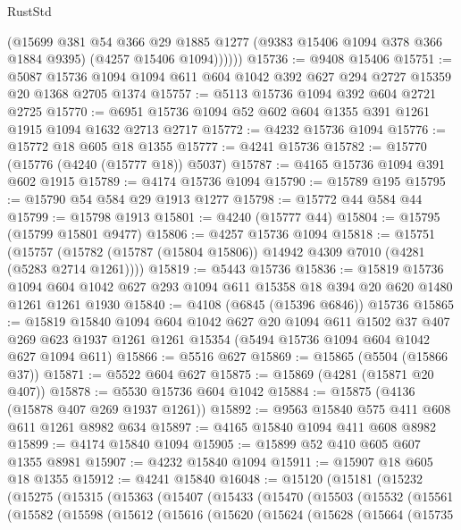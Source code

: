 \begin{lexlean}{RustStd}
\begin{coremodule}
            (@15699
              @381
              @54
              @366
              @29
              @1885
              @1277
              (@9383 @15406 @1094 @378 @366 @1884 @9395)
              (@4257 @15406 @1094))))))
@15736 := @9408 @15406
@15751 := @5087 @15736 @1094 @1094 @611 @604 @1042 @392 @627 @294 @2727 @15359 @20 @1368 @2705 @1374
@15757 := @5113 @15736 @1094 @392 @604 @2721 @2725
@15770 := @6951 @15736 @1094 @52 @602 @604 @1355 @391 @1261 @1915 @1094 @1632 @2713 @2717
@15772 := @4232 @15736 @1094
@15776 := @15772 @18 @605 @18 @1355
@15777 := @4241 @15736
@15782 := @15770 (@15776 (@4240 (@15777 @18)) @5037)
@15787 := @4165 @15736 @1094 @391 @602 @1915
@15789 := @4174 @15736 @1094
@15790 := @15789 @195
@15795 := @15790 @54 @584 @29 @1913 @1277
@15798 := @15772 @44 @584 @44
@15799 := @15798 @1913
@15801 := @4240 (@15777 @44)
@15804 := @15795 (@15799 @15801 @9477)
@15806 := @4257 @15736 @1094
@15818 := @15751
    (@15757 (@15782 (@15787 (@15804 @15806)) @14942 @4309 @7010 (@4281 (@5283 @2714 @1261))))
@15819 := @5443 @15736
@15836 := @15819
    @15736
    @1094
    @604
    @1042
    @627
    @293
    @1094
    @611
    @15358
    @18
    @394
    @20
    @620
    @1480
    @1261
    @1261
    @1930
@15840 := @4108 (@6845 (@15396 @6846)) @15736
@15865 := @15819
    @15840
    @1094
    @604
    @1042
    @627
    @20
    @1094
    @611
    @1502
    @37
    @407
    @269
    @623
    @1937
    @1261
    @1261
    @15354
    (@5494 @15736 @1094 @604 @1042 @627 @1094 @611)
@15866 := @5516 @627
@15869 := @15865 (@5504 (@15866 @37))
@15871 := @5522 @604 @627
@15875 := @15869 (@4281 (@15871 @20 @407))
@15878 := @5530 @15736 @604 @1042
@15884 := @15875 (@4136 (@15878 @407 @269 @1937 @1261))
@15892 := @9563 @15840 @575 @411 @608 @611 @1261 @8982 @634
@15897 := @4165 @15840 @1094 @411 @608 @8982
@15899 := @4174 @15840 @1094
@15905 := @15899 @52 @410 @605 @607 @1355 @8981
@15907 := @4232 @15840 @1094
@15911 := @15907 @18 @605 @18 @1355
@15912 := @4241 @15840
@16048 := @15120
    (@15181
      (@15232
        (@15275
          (@15315
            (@15363
              (@15407
                (@15433
                  (@15470
                    (@15503
                      (@15532
                        (@15561
                          (@15582
                            (@15598
                              (@15612
                                (@15616
                                  (@15620
                                    (@15624
                                      (@15628
                                        (@15664
                                          (@15735

\end{coremodule}
\end{lexlean}
